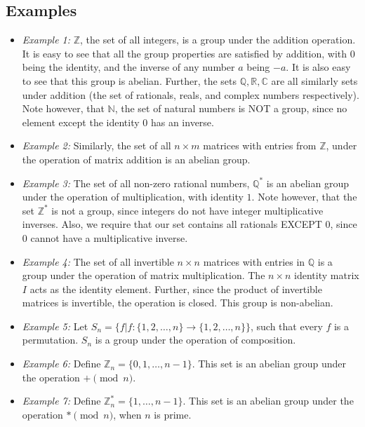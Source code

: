 \subsection{Examples}
\begin{itemize}
  \item \emph{Example 1:} $\mathbb{Z}$, the set of all integers, is a group under the addition operation.
    It is easy to see that all the group properties are satisfied by addition, with $0$ being the identity, and the inverse of any number $a$ being $-a$.
    It is also easy to see that this group is abelian.
    Further, the sets $\mathbb{Q}, \mathbb{R}, \mathbb{C}$ are all similarly sets under addition (the set of rationals, reals, and complex numbers respectively). \\
    Note however, that $\mathbb{N}$, the set of natural numbers is NOT a group, since no element except the identity $0$ has an inverse.
  \item \emph{Example 2:} Similarly, the set of all $n \times m$ matrices with entries from $\mathbb{Z}$, under the operation of matrix addition is an abelian group.
  \item \emph{Example 3:} The set of all non-zero rational numbers, $\mathbb{Q^{*}}$ is an abelian group under the operation of multiplication, with identity $1$.
    Note however, that the set $\mathbb{Z^{*}}$ is not a group, since integers do not have integer multiplicative inverses.
    Also, we require that our set contains all rationals EXCEPT $0$, since $0$ cannot have a multiplicative inverse.
  \item \emph{Example 4:} The set of all invertible $n \times n$ matrices with entries in $\mathbb{Q}$ is a group under the operation of matrix multiplication.
    The $n \times n$ identity matrix $I$ acts as the identity element.
    Further, since the product of invertible matrices is invertible, the operation is closed.
    This group is non-abelian.
  \item \emph{Example 5:} Let $S_{n} = \{f | f:\{1, 2, \dots , n\} \rightarrow \{1, 2, \dots , n\}\}$, such that every $f$ is a permutation.
    $S_{n}$ is a group under the operation of composition.
  \item \emph{Example 6:} Define $\mathbb{Z}_{n} = \{0, 1, \dots ,n - 1\}$.
    This set is an abelian group under the operation $+ \pmod{n}$.
  \item \emph{Example 7:} Define $\mathbb{Z}_{n}^{*} = \{1, \dots ,n - 1\}$.
    This set is an abelian group under the operation $* \pmod{n}$, when $n$ is prime.\\

\end{itemize}
